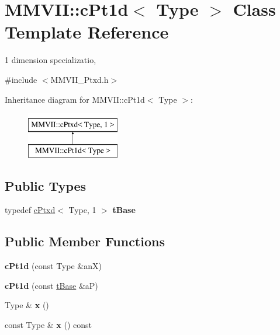 \hypertarget{classMMVII_1_1cPt1d}{}\section{M\+M\+V\+II\+:\+:c\+Pt1d$<$ Type $>$ Class Template Reference}
\label{classMMVII_1_1cPt1d}


1 dimension specializatio,  




{\ttfamily \#include $<$M\+M\+V\+I\+I\+\_\+\+Ptxd.\+h$>$}

Inheritance diagram for M\+M\+V\+II\+:\+:c\+Pt1d$<$ Type $>$\+:\begin{figure}[H]
\begin{center}
\leavevmode
\includegraphics[height=2.000000cm]{classMMVII_1_1cPt1d}
\end{center}
\end{figure}
\subsection*{Public Types}
\begin{DoxyCompactItemize}
\item 
typedef \hyperlink{classMMVII_1_1cPtxd}{c\+Ptxd}$<$ Type, 1 $>$ {\bfseries t\+Base}\hypertarget{classMMVII_1_1cPt1d_a3cc8935cf9899e253abb01f6fbf8b0ad}{}\label{classMMVII_1_1cPt1d_a3cc8935cf9899e253abb01f6fbf8b0ad}

\end{DoxyCompactItemize}
\subsection*{Public Member Functions}
\begin{DoxyCompactItemize}
\item 
{\bfseries c\+Pt1d} (const Type \&anX)\hypertarget{classMMVII_1_1cPt1d_a88a8855bd6a6dd73d291337e3d7f6f0e}{}\label{classMMVII_1_1cPt1d_a88a8855bd6a6dd73d291337e3d7f6f0e}

\item 
{\bfseries c\+Pt1d} (const \hyperlink{classMMVII_1_1cPtxd}{t\+Base} \&aP)\hypertarget{classMMVII_1_1cPt1d_a5106efb75ce440d40e0dfcca2982582f}{}\label{classMMVII_1_1cPt1d_a5106efb75ce440d40e0dfcca2982582f}

\item 
Type \& {\bfseries x} ()\hypertarget{classMMVII_1_1cPt1d_ad80be0e1d3c8c66c5bc14ac56524149b}{}\label{classMMVII_1_1cPt1d_ad80be0e1d3c8c66c5bc14ac56524149b}

\item 
const Type \& {\bfseries x} () const \hypertarget{classMMVII_1_1cPt1d_aba59531e6f86c6b841e55e610325401f}{}\label{classMMVII_1_1cPt1d_aba59531e6f86c6b841e55e610325401f}

\end{DoxyCompactItemize}
